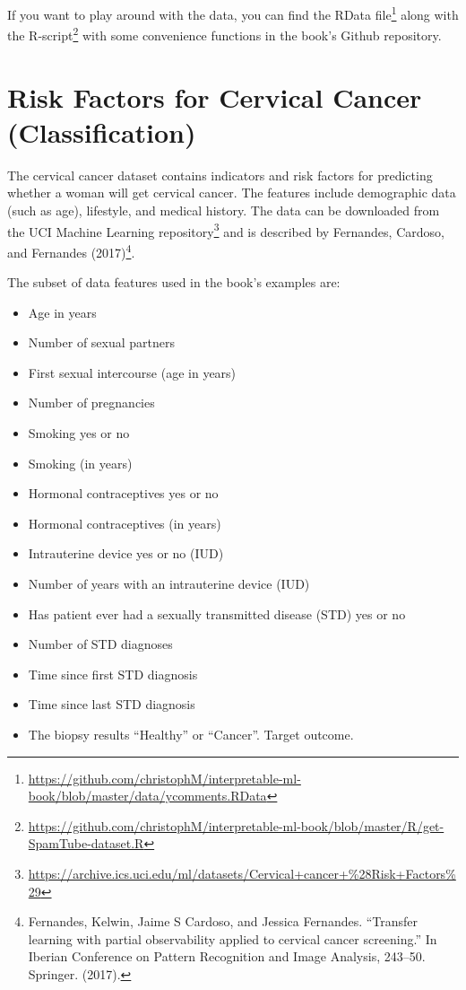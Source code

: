 \documentclass[
  11pt,
]{scrbook}
\providecommand{\tightlist}{%
  \setlength{\itemsep}{0pt}\setlength{\parskip}{0pt}}
\renewcommand{\href}[2]{#2\footnote{\url{#1}}}
\begin{document}
If you want to play around with the data, you can find the \href{https://github.com/christophM/interpretable-ml-book/blob/master/data/ycomments.RData}{RData file} along with the \href{https://github.com/christophM/interpretable-ml-book/blob/master/R/get-SpamTube-dataset.R}{R-script} with some convenience functions in the book's Github repository.

\hypertarget{cervical}{%
\section{Risk Factors for Cervical Cancer (Classification)}\label{cervical}}

The cervical cancer dataset contains indicators and risk factors for predicting whether a woman will get cervical cancer.
The features include demographic data (such as age), lifestyle, and medical history.
The data can be downloaded from the \href{https://archive.ics.uci.edu/ml/datasets/Cervical+cancer+\%28Risk+Factors\%29}{UCI Machine Learning repository} and is described by Fernandes, Cardoso, and Fernandes (2017)\footnote{Fernandes, Kelwin, Jaime S Cardoso, and Jessica Fernandes. ``Transfer learning with partial observability applied to cervical cancer screening.'' In Iberian Conference on Pattern Recognition and Image Analysis, 243--50. Springer. (2017).}.

The subset of data features used in the book's examples are:

\begin{itemize}
\tightlist
\item
  Age in years
\item
  Number of sexual partners
\item
  First sexual intercourse (age in years)
\item
  Number of pregnancies
\item
  Smoking yes or no
\item
  Smoking (in years)
\item
  Hormonal contraceptives yes or no
\item
  Hormonal contraceptives (in years)
\item
  Intrauterine device yes or no (IUD)
\item
  Number of years with an intrauterine device (IUD)
\item
  Has patient ever had a sexually transmitted disease (STD) yes or no
\item
  Number of STD diagnoses
\item
  Time since first STD diagnosis
\item
  Time since last STD diagnosis
\item
  The biopsy results ``Healthy'' or ``Cancer''. Target outcome.
\end{itemize}
\end{document}
